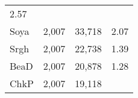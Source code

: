 \documentclass[]{article}
\begin{document}
\begin{longtable}[]{@{}lrrr@{}}
\begin{minipage}[t]{0.09\columnwidth}
2.57\strut
\end{minipage}\tabularnewline
\begin{minipage}[t]{0.16\columnwidth}\raggedright\strut
Soya\strut
\end{minipage} & \begin{minipage}[t]{0.09\columnwidth}\raggedleft\strut
2,007\strut
\end{minipage} & \begin{minipage}[t]{0.12\columnwidth}\raggedleft\strut
33,718\strut
\end{minipage} & \begin{minipage}[t]{0.09\columnwidth}\raggedleft\strut
2.07\strut
\end{minipage}\tabularnewline
\begin{minipage}[t]{0.16\columnwidth}\raggedright\strut
Srgh\strut
\end{minipage} & \begin{minipage}[t]{0.09\columnwidth}\raggedleft\strut
2,007\strut
\end{minipage} & \begin{minipage}[t]{0.12\columnwidth}\raggedleft\strut
22,738\strut
\end{minipage} & \begin{minipage}[t]{0.09\columnwidth}\raggedleft\strut
1.39\strut
\end{minipage}\tabularnewline
\begin{minipage}[t]{0.16\columnwidth}\raggedright\strut
BeaD\strut
\end{minipage} & \begin{minipage}[t]{0.09\columnwidth}\raggedleft\strut
2,007\strut
\end{minipage} & \begin{minipage}[t]{0.12\columnwidth}\raggedleft\strut
20,878\strut
\end{minipage} & \begin{minipage}[t]{0.09\columnwidth}\raggedleft\strut
1.28\strut
\end{minipage}\tabularnewline
\begin{minipage}[t]{0.16\columnwidth}\raggedright\strut
ChkP\strut
\end{minipage} & \begin{minipage}[t]{0.09\columnwidth}\raggedleft\strut
2,007\strut
\end{minipage} & \begin{minipage}[t]{0.12\columnwidth}\raggedleft\strut
19,118\strut
\end{minipage} & \begin{minipage}[t]{0.09\columnwidth}\raggedleft\strut

\end{minipage}
\end{longtable}
\end{document}
